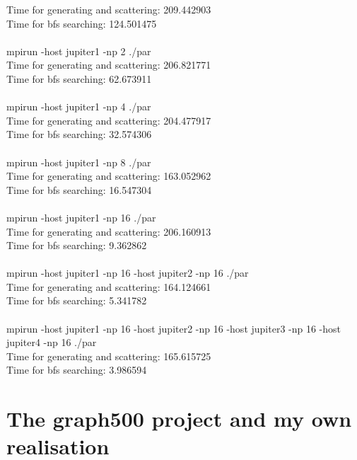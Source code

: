 \documentclass[12pt,a4paper]{article}
\begin{document}
Time for generating and scattering: 209.442903\\
Time for bfs searching: 124.501475\\
\\
mpirun -host jupiter1 -np 2 ./par\\
Time for generating and scattering: 206.821771\\
Time for bfs searching: 62.673911\\
\\
mpirun -host jupiter1 -np 4 ./par\\
Time for generating and scattering: 204.477917\\
Time for bfs searching: 32.574306\\
\\
mpirun -host jupiter1 -np 8 ./par\\
Time for generating and scattering: 163.052962\\
Time for bfs searching: 16.547304\\
\\
mpirun -host jupiter1 -np 16 ./par\\
Time for generating and scattering: 206.160913\\
Time for bfs searching: 9.362862\\
\\
mpirun -host jupiter1 -np 16 -host jupiter2 -np 16 ./par\\
Time for generating and scattering: 164.124661\\
Time for bfs searching: 5.341782\\
\\
mpirun -host jupiter1 -np 16 -host jupiter2 -np 16 -host jupiter3 -np 16 -host jupiter4 -np 16 ./par\\
Time for generating and scattering: 165.615725\\
Time for bfs searching: 3.986594\\


\section{The graph500 project and my own realisation}
\label{sec:graph500}
\end{document}
